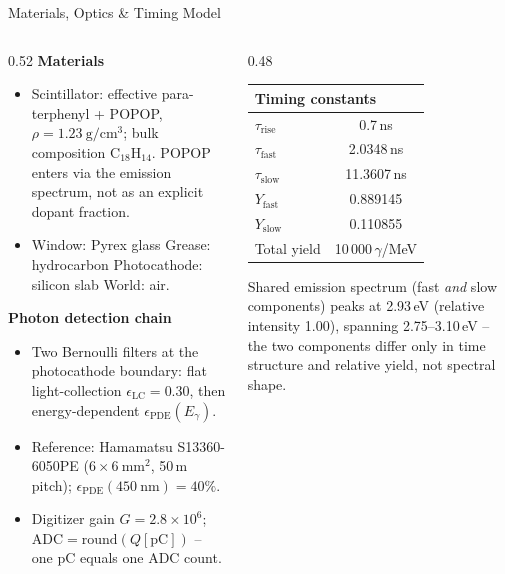 \documentclass[aspectratio=169,10pt]{beamer}
\begin{document}
\begin{frame}{Materials, Optics \& Timing Model}
  \begin{columns}[T]
    \begin{column}{0.52\textwidth}
      \footnotesize
      \textbf{Materials}
      \begin{itemize}
        \item Scintillator: effective para-terphenyl + POPOP,
          $\rho = 1.23~\mathrm{g/cm^3}$; bulk composition
          $\mathrm{C_{18}H_{14}}$. POPOP enters via the emission
          spectrum, not as an explicit dopant fraction.
        \item Window: Pyrex glass \quad Grease: hydrocarbon \quad
          Photocathode: silicon slab \quad World: air.
      \end{itemize}
      \vspace{3pt}
      \textbf{Photon detection chain}
      \begin{itemize}
        \item Two Bernoulli filters at the photocathode boundary: flat
          light-collection $\epsilon_\mathrm{LC}=0.30$, then
          energy-dependent $\epsilon_\mathrm{PDE}(E_\gamma)$.
        \item Reference: Hamamatsu S13360-6050PE
          ($6\times6~\mathrm{mm^2}$, 50\,\textmu m pitch);
          $\epsilon_\mathrm{PDE}(450~\mathrm{nm})=40\%$.
        \item Digitizer gain $G=2.8\times10^6$;
          $\mathrm{ADC}=\mathrm{round}(Q[\mathrm{pC}])$ -- one pC equals
          one ADC count.
      \end{itemize}
    \end{column}
    \begin{column}{0.48\textwidth}
      \scriptsize
      \begin{tabular}{lc}
        \toprule
        \multicolumn{2}{l}{\textbf{Timing constants}} \\
        \midrule
        $\tau_\mathrm{rise}$ & 0.7\,ns \\
        $\tau_\mathrm{fast}$ & 2.0348\,ns \\
        $\tau_\mathrm{slow}$ & 11.3607\,ns \\
        $Y_\mathrm{fast}$ & 0.889145 \\
        $Y_\mathrm{slow}$ & 0.110855 \\
        Total yield & 10\,000\,$\gamma$/MeV \\
        \bottomrule
      \end{tabular}

      \vspace{6pt}
      \raggedright
      Shared emission spectrum (fast \emph{and} slow components) peaks at
      2.93\,eV (relative intensity 1.00), spanning
      2.75--3.10\,eV -- the two components differ only in time structure
      and relative yield, not spectral shape.
    \end{column}
  \end{columns}
\end{frame}
\end{document}
